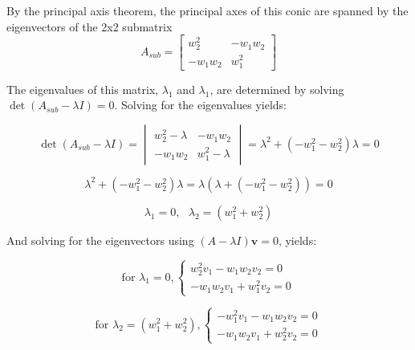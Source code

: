 \documentclass[11pt]{article}
\newcommand{\bs}[1]{\boldsymbol{#1}} %
\begin{document}
        By the principal axis theorem, the principal axes of this conic are spanned by the eigenvectors of the 2x2 submatrix
        \setcounter{equation}{44}
        \begin{equation}
            A_{sub} = \begin{bmatrix} w_2^2 & -w_1w_2 \\ -w_1w_2 & w_1^2\end{bmatrix}
            \label{eq:Eq45}
        \end{equation}
    
        The eigenvalues of this matrix, $\lambda_1$ and $\lambda_1$, are determined by solving $\det(A_{sub}-\lambda I) = 0$. Solving for the eigenvalues yields:
    
        \begin{equation}
            \det(A_{sub}-\lambda I) = \begin{vmatrix} w_2^2 - \lambda & -w_1w_2 \\ -w_1w_2 & w_1^2 - \lambda\end{vmatrix} = \lambda^2 + (-w_1^2 - w_2^2)\lambda = 0
            \label{eq:Eq46}
        \end{equation}
        
        \begin{equation}
            \lambda^2 + (-w_1^2 - w_2^2)\lambda = \lambda\left(\lambda + (-w_1^2 - w_2^2)\right) = 0
            \label{eq:Eq47}
        \end{equation}
        
        \begin{equation}
            \lambda_1 = 0,\text{ } \lambda_2 = (w_1^2 + w_2^2)
            \label{eq:Eq48}
        \end{equation}
    
        And solving for the eigenvectors using $(A - \lambda I)\bs{v} = 0$, yields:
    
        \begin{equation}
            \text{for }\lambda_1 = 0,  \left\{ \begin{array}{l} w_2^2v_1 - w_1w_2v_2 = 0 \\
                                                                -w_1w_2v_1 + w_1^2v_2 = 0 \end{array}\right.
            \label{eq:Eq49}
        \end{equation}
        
        \begin{equation}
            \text{for }\lambda_2 = (w_1^2 + w_2^2),  \left\{ \begin{array}{l}   -w_1^2v_1 - w_1w_2v_2 = 0 \\
                                                                                -w_1w_2v_1 + w_2^2v_2 = 0 \end{array}\right.
            \label{eq:Eq50}
        \end{equation}
        
\end{document}
